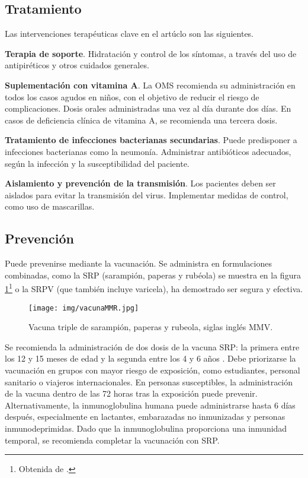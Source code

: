 \subsection{Tratamiento}
Las intervenciones terapéuticas clave en el artúclo \cite{graber2020update} son las siguientes.

\textbf{Terapia de soporte}.
Hidratación y control de los síntomas, a través del uso de antipiréticos y otros cuidados generales.

\textbf{Suplementación con vitamina A}.
La OMS recomienda su administración en todos los casos agudos en niños, con el objetivo de reducir el riesgo de complicaciones.
Dosis orales administradas una vez al día durante dos días. En casos de deficiencia clínica de vitamina A, se recomienda una tercera dosis.

\textbf{Tratamiento de infecciones bacterianas secundarias}.
Puede predisponer a infecciones bacterianas como la neumonía. Administrar antibióticos adecuados, según la infección y la susceptibilidad del paciente.

\textbf{Aislamiento y prevención de la transmisión}.
Los pacientes deben ser aislados para evitar la transmisión del virus. Implementar medidas de control, como uso de mascarillas.

\subsection{Prevención}
Puede prevenirse mediante la vacunación. Se administra en formulaciones combinadas, como la SRP (sarampión, paperas y rubéola) se muestra en la figura \ref{fig:vacuna sarampión}\footnote{Obtenida de \cite{aarp_sarampion_2019}.} o la SRPV (que también incluye varicela), ha demostrado ser segura y efectiva.

\begin{figure}[H]
        \centering
        \texttt{[image: img/vacunaMMR.jpg]}
        \caption{Vacuna triple de sarampión, paperas y rubeola, siglas inglés MMV.}
        \label{fig:vacuna sarampión}
        \vspace{0.5cm} %
\end{figure}

Se recomienda la administración de dos dosis de la vacuna SRP: la primera entre los 12 y 15 meses de edad y la segunda entre los 4 y 6 años \cite{gastanaduy2021measles}. Debe priorizarse la vacunación en grupos con mayor riesgo de exposición, como estudiantes, personal sanitario o viajeros internacionales.
En personas susceptibles, la administración de la vacuna dentro de las 72 horas tras la exposición puede prevenir. Alternativamente, la inmunoglobulina humana puede administrarse hasta 6 días después, especialmente en lactantes, embarazadas no inmunizadas y personas inmunodeprimidas. Dado que la inmunoglobulina proporciona una inmunidad temporal, se recomienda completar la vacunación con SRP.

